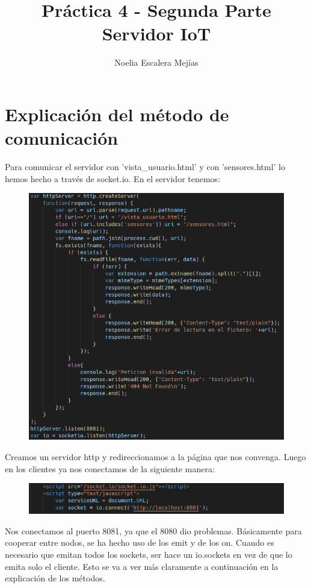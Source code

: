 \documentclass{article}
\title{Práctica 4 - Segunda Parte\\Servidor IoT}
\author{Noelia Escalera Mejías}
\begin{document}
	\maketitle
	\section{Explicación del método de comunicación}
	Para comunicar el servidor con 'vista\_usuario.html' y con 'sensores.html' lo hemos hecho a través de socket.io. En el servidor tenemos:
	\begin{figure}[H]
		\centering
		\includegraphics[totalheight=11.7cm]{img/39.png}
	\end{figure}
	Creamos un servidor http y redireccionamos a la página que nos convenga. Luego en los clientes ya nos conectamos de la siguiente manera:
	 \begin{figure}[H]
	 	\centering
	 	\includegraphics[totalheight=1.5cm]{img/40.png}
	 \end{figure}
 	Nos conectamos al puerto 8081, ya que el 8080 dio problemas. Básicamente para cooperar entre nodos, se ha hecho uso de los emit y de los on. Cuando es necesario que emitan todos los sockets, ser hace un io.sockets en vez de que lo emita solo el cliente. Esto se va a ver más claramente a continuación en la explicación de los métodos.
\end{document}
